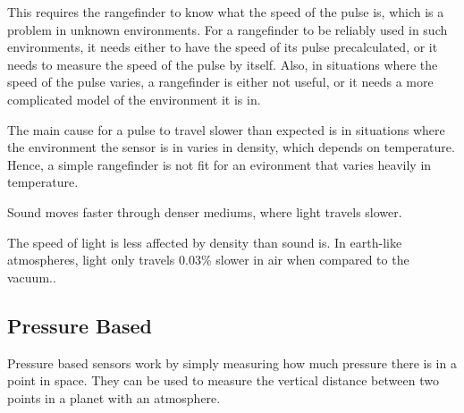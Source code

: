 This requires the rangefinder to know what the speed of the pulse is, which is a problem in unknown environments. For a rangefinder to be reliably used in such environments, it needs either to have the speed of its pulse precalculated, or it needs to measure the speed of the pulse by itself. Also, in situations where the speed of the pulse varies, a rangefinder is either not useful, or it needs a more complicated model of the environment it is in.

The main cause for a pulse to travel slower than expected is in situations where the environment the sensor is in varies in density, which depends on temperature\cite{refraction}. Hence, a simple rangefinder is not fit for an evironment that varies heavily in temperature.


Sound moves faster through denser mediums, where light travels slower.

The speed of light is less affected by density than sound is. In earth-like atmospheres, light only travels 0.03\% slower in air when compared to the vacuum.\cite{refraction}\cite{speedOfSound}.

\subsection{Pressure Based}
Pressure based sensors work by simply measuring how much pressure there is in a point in space. They can be used to measure the vertical distance between two points in a planet with an atmosphere\cite{barometric1}\cite{barometric2}.
